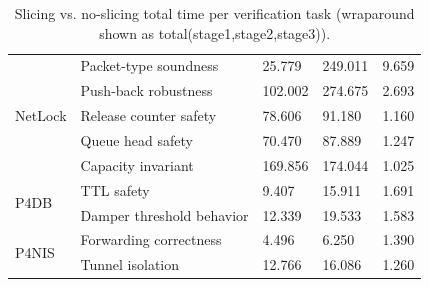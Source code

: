 \begin{table}[t]
{\begin{tabular}{|l|l|l|l|l|}
\hline
\multirow{5}{*}{NetLock} & Packet-type soundness & 25.779 & 249.011 & 9.659 \\
 & Push-back robustness & 102.002 & 274.675 & 2.693 \\
 & Release counter safety & 78.606 & 91.180 & 1.160 \\
 & Queue head safety & 70.470 & 87.889 & 1.247 \\
 & Capacity invariant & 169.856 & 174.044 & 1.025 \\
\hline
\multirow{2}{*}{P4DB} & TTL safety & 9.407 & 15.911 & 1.691 \\
 & Damper threshold behavior & 12.339 & 19.533 & 1.583 \\
\hline
\multirow{2}{*}{P4NIS} & Forwarding correctness & 4.496 & 6.250 & 1.390 \\
 & Tunnel isolation & 12.766 & 16.086 & 1.260 \\
\hline
\end{tabular}%
}
\caption{Slicing vs. no-slicing total time per verification task (wraparound shown as total(stage1,stage2,stage3)).}
\label{tab:time_slicing}
\vspace{-4mm}
\end{table}
